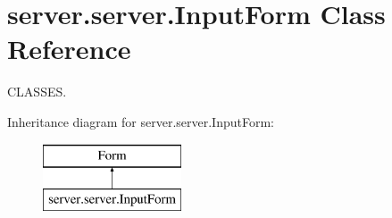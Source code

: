 \hypertarget{classserver_1_1server_1_1_input_form}{}\section{server.\+server.\+Input\+Form Class Reference}
\label{classserver_1_1server_1_1_input_form}


C\+L\+A\+S\+S\+ES.  


Inheritance diagram for server.\+server.\+Input\+Form\+:\begin{figure}[H]
\begin{center}
\leavevmode
\includegraphics[height=2.000000cm]{classserver_1_1server_1_1_input_form}
\end{center}
\end{figure}
